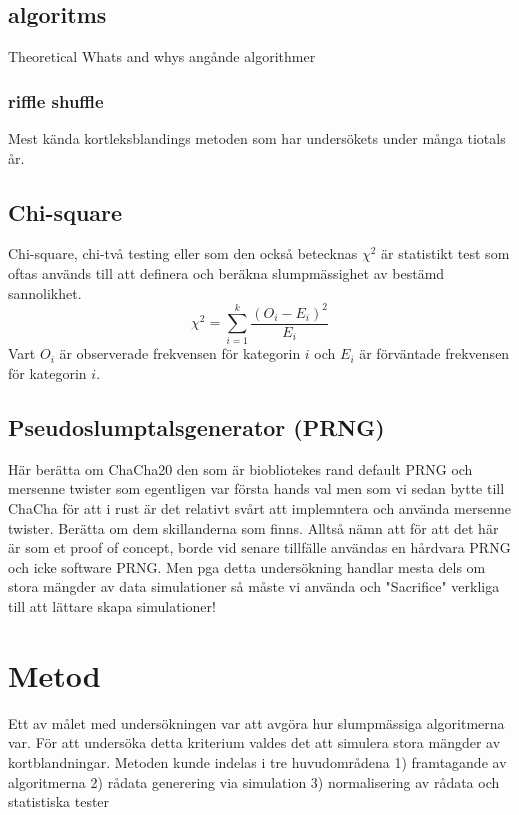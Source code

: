 \documentclass[a4paper]{article}
\begin{document}
\subsection{algoritms}
Theoretical Whats and whys angånde algorithmer

\subsubsection{riffle shuffle}
Mest kända kortleksblandings metoden som har undersökets under många tiotals år.

\subsection{Chi-square}
\label{sec:chi_square}
Chi-square, chi-två testing eller som den också betecknas $\chi^2$ är statistikt test
som oftas används till att definera och beräkna slumpmässighet av bestämd sannolikhet.
$$ \chi^2 = \sum_{i=1}^k \frac{(O_i - E_i)^2}{E_i}$$
Vart $O_i$ är observerade frekvensen för kategorin $i$ och $E_i$ är förväntade
frekvensen för kategorin $i$.

\subsection{Pseudoslumptalsgenerator (PRNG)}
Här berätta om ChaCha20 \parencite{chacha} den som är biobliotekes rand
\parencite{rand_crate} default PRNG och mersenne twister som egentligen var första
hands val
\parencite{mersenne_twister} men som vi sedan bytte till ChaCha för att i rust
är det relativt svårt att implemntera och använda mersenne twister. Berätta om
dem skillanderna som finns.
Alltså nämn att för att det här är som et proof of concept, borde vid
senare tillfälle användas en hårdvara PRNG och icke software PRNG.
Men pga detta undersökning handlar mesta dels om stora mängder av data
simulationer så måste vi använda och "Sacrifice" verkliga till att lättare
skapa simulationer!

\section{Metod}

Ett av målet med undersökningen var att avgöra hur slumpmässiga algoritmerna
var. För att undersöka detta kriterium valdes det att simulera stora mängder av
kortblandningar. Metoden kunde indelas i tre huvudområdena 1) framtagande av
algoritmerna 2) rådata generering via simulation 3) normalisering av
rådata och statistiska tester 
\end{document}
